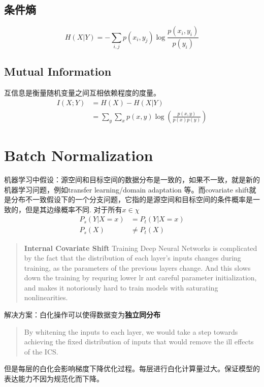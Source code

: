 \subsection{条件熵}
\begin{equation}
    H(X|Y) = -\sum_{i,j}p(x_i, y_j)\log \frac{p(x_i, y_i)}{p(y_i)}
\end{equation}

\subsection{Mutual Information}
互信息是衡量随机变量之间互相依赖程度的度量。
\begin{equation}
    \begin{split}
        I(X;Y) &= H(X) - H(X|Y) \\
        &=\sum_y\sum_x p(x, y)\log(\frac{p(x, y)}{p(x)p(y)})
    \end{split}
\end{equation}

\section{Batch Normalization}
机器学习中假设：源空间和目标空间的数据分布是一致的，如果不一致，就是新的机器学习问题，例如transfer learning/domain adaptation
等。而covariate shift就是分布不一致假设下的一个分支问题，它指的是源空间和目标空间的条件概率是一致的，但是其边缘概率不同.
对于所有$x \in \chi $
\begin{equation}
    \begin{split}
        P_s(Y|X = x) &= P_t(Y|X = x) \\
        P_s(X) &\neq P_t(X)
    \end{split}
\end{equation}
\begin{quotation}
    \textbf{Internal Covariate Shift} Training Deep Neural Networks is complicated by the fact that the distribution of each layer's inputs
changes during training, as the parameters of the previous layers change. And this slows down the training 
by requring lower lr ant careful parameter initialization, and makes it notoriously hard to train models
with saturating nonlinearities.
\end{quotation}
解决方案：白化操作可以使得数据变为\textbf{独立同分布}
\begin{quotation}
    By whitening the inputs to each layer, we would take a step towards achieving the fixed distribution
    of inputs that would remove the ill effects of the ICS.
\end{quotation}
但是每层的白化会影响梯度下降优化过程。每层进行白化计算量过大。保证模型的表达能力不因为规范化而下降。 


